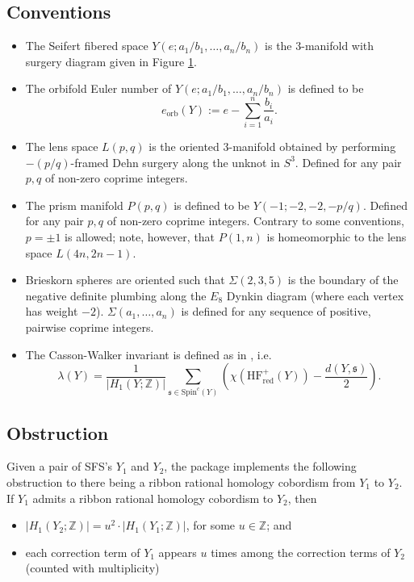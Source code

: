 \documentclass[12pt]{amsart}
\theoremstyle{definition}
\theoremstyle{remark}
\numberwithin{equation}{section}
\begin{document}
\subsection*{Conventions}
\begin{itemize}
\item The Seifert fibered space $Y(e;a_{1}/b_{1},\dots,a_{n}/b_{n})$ is the $3$-manifold with surgery diagram given in Figure \ref{diag}.
\begin{figure}[h]
\def\svgwidth{200pt}

\caption{}
\label{diag}
\end{figure}
\item The orbifold Euler number of $Y(e;a_{1}/b_{1},\dots,a_{n}/b_{n})$ is defined to be \[e_{\text{orb}}(Y):=e - \sum_{i=1}^{n}\frac{b_{i}}{a_{i}}.\]
\item The lens space $L(p,q)$ is the oriented $3$-manifold obtained by performing $-(p/q)$-framed Dehn surgery along the unknot in $S^{3}$.
Defined for any pair $p,q$ of non-zero coprime integers. 
\item The prism manifold $P(p,q)$ is defined to be $Y(-1;-2,-2,-p/q)$.
Defined for any pair $p,q$ of non-zero coprime integers.
Contrary to some conventions, $p=\pm1$ is allowed; note, however, that $P(1,n)$ is homeomorphic to the lens space $L(4n,2n-1)$.
\item Brieskorn spheres are oriented such that $\Sigma(2,3,5)$ is the boundary of the negative definite plumbing along the $E_{8}$ Dynkin diagram (where each vertex has weight $-2$).
$\Sigma(a_{1},\dots,a_{n})$ is defined for any sequence of positive, pairwise coprime integers.
\item The Casson-Walker invariant is defined as in \cite{Rustamov}, i.e. \[\lambda(Y)=\frac{1}{|H_{1}(Y;\mathbb{Z})|}\sum_{\mathfrak{s}\in\mathrm{Spin}^{c}(Y)}\left(\chi(\mathrm{HF}^{+}_{\mathrm{red}}(Y))-\frac{d(Y,\mathfrak{s})}{2}\right).\]
\end{itemize}

\subsection*{Obstruction}
Given a pair of SFS's $Y_1$ and $Y_2$, the package implements the following obstruction to there being a ribbon rational homology cobordism from $Y_1$ to $Y_2$.
If $Y_1$ admits a ribbon rational homology cobordism to $Y_2$, then
\begin{itemize}
\item $|H_{1}(Y_{2};\mathbb{Z})|=u^{2}\cdot|H_{1}(Y_{1};\mathbb{Z})|$, for some $u\in\mathbb{Z}$; and
\item each correction term of $Y_{1}$ appears $u$ times among the correction terms of $Y_{2}$ (counted with multiplicity)
\end{itemize}
\end{document}
